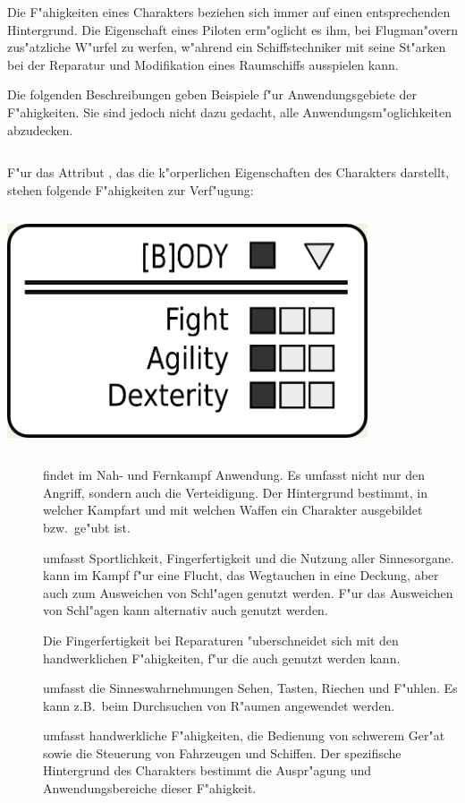 Die F"ahigkeiten eines Charakters beziehen sich immer auf einen entsprechenden Hintergrund. Die Eigenschaft  eines Piloten erm"oglicht es ihm, bei Flugman"overn zus"atzliche W"urfel zu werfen, w"ahrend ein Schiffstechniker mit  seine St"arken bei der Reparatur und Modifikation eines Raumschiffs ausspielen kann.

Die folgenden Beschreibungen geben Beispiele f"ur Anwendungsgebiete der F"ahigkeiten. Sie sind jedoch nicht dazu gedacht, alle Anwendungsm"oglichkeiten abzudecken.

\medskip
\begin{column}[l]{0.55}
    F"ur das Attribut , das die k"orperlichen Eigenschaften des Charakters darstellt, stehen folgende F"ahigkeiten zur Verf"ugung:
\end{column}
\begin{column}[r]{0.45}
    \centering
    \includegraphics[width=0.80\textwidth]{images/character_body.jpg}
\end{column}

\begin{description}
    \item[]  findet im Nah- und Fernkampf Anwendung. Es umfasst nicht nur den Angriff, sondern auch die 
        Verteidigung. Der Hintergrund bestimmt, in welcher Kampfart und mit welchen Waffen ein Charakter ausgebildet bzw.~ge"ubt ist.
    \item[]  umfasst Sportlichkeit, Fingerfertigkeit und die Nutzung aller Sinnesorgane.  kann 
        im Kampf f"ur eine Flucht, das Wegtauchen in eine Deckung, aber auch zum Ausweichen von Schl"agen genutzt werden. F"ur das Ausweichen von Schl"agen kann alternativ auch  genutzt werden.

        Die Fingerfertigkeit bei Reparaturen "uberschneidet sich mit den handwerklichen F"ahigkeiten, f"ur die auch  genutzt werden kann.
    
         umfasst die Sinneswahrnehmungen Sehen, Tasten, Riechen und F"uhlen. Es kann z.B.~beim Durchsuchen von R"aumen angewendet werden. 
    \item[]  umfasst handwerkliche F"ahigkeiten, die Bedienung von schwerem Ger"at sowie die Steuerung von 
        Fahrzeugen und Schiffen. Der spezifische Hintergrund des Charakters bestimmt die Auspr"agung und Anwendungsbereiche dieser F"ahigkeit.
\end{description}

